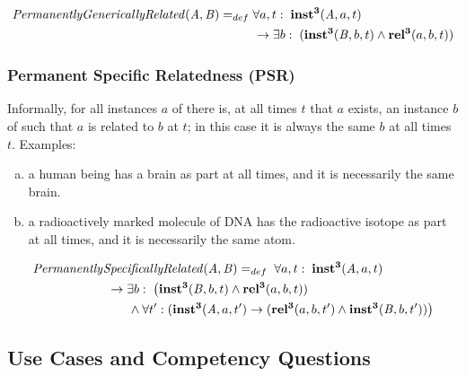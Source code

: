 \begin{equation}
\begin{split}
\mathit{PermanentlyGenericallyRelated}(\mathit{A},\mathit{B}) =_{def}&\;
\forall a, t:\; \mathrm{\mathbf{inst^3}}(\mathit{A}, a, t) \\
&\ \rightarrow
\exists b:\;(\mathrm{\mathbf{inst^3}}(\mathit{B},b,t) \wedge
\mathrm{\mathbf{rel^3}}(a,b,t))
\end{split}
\label{eq:generically:cls}
\end{equation}


\subsubsection*{Permanent Specific Relatedness (PSR)}

Informally, for all instances $a$ of  there is, at all times $t$ that $a$ exists, an
instance $b$ of  such that $a$ is related to $b$ at $t$; in this case it is always the
same $b$ at all times $t$. Examples:
\begin{enumerate}[(a)]
\item a human being has a brain as part at all times, and it is necessarily the same brain.
\item a radioactively marked molecule of DNA has the radioactive isotope as part
at all times, and it is necessarily the same atom.
\end{enumerate}

\begin{equation}
\begin{split}
\mathit{Permanently}&\mathit{SpecificallyRelated}(\mathit{A},\mathit{B}) =_{def}\;
\forall a, t:\; \mathrm{\mathbf{inst^3}}(\mathit{A}, a, t) \\
&\ \rightarrow
\exists b:\;\big(\mathrm{\mathbf{inst^3}}(\mathit{B},b,t) \wedge
\mathrm{\mathbf{rel^3}}(a,b,t))
\\
&\quad\quad \wedge \forall t^\prime: (\mathrm{\mathbf{inst^3}}(\mathit{A},a,t^\prime)
\rightarrow (\mathrm{\mathbf{rel^3}}(a,b,t^\prime) \wedge
\mathrm{\mathbf{inst^3}}(\mathit{B},b,t^\prime))\big)
\end{split}
\label{eq:specifically:cls}
\end{equation}


\subsection*{Use Cases and Competency Questions}


